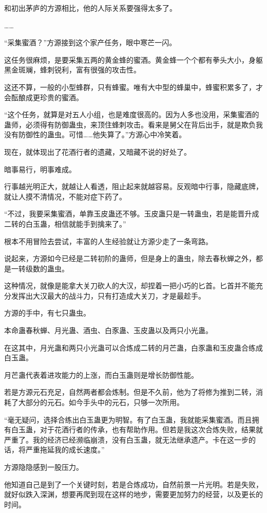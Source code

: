 \begin{this_body}
和初出茅庐的方源相比，他的人际关系要强得太多了。

……

“采集蜜酒？”方源接到这个家产任务，眼中寒芒一闪。

这任务很麻烦，是要采集五两的黄金蜂的蜜酒。黄金蜂一个个都有拳头大小，身躯黑金斑斓，蜂刺锐利，富有很强的攻击性。

这还不算，一般的小型蜂群，只有蜂蜜。唯有大中型的蜂巢中，蜂蜜积累多了，才会酝酿成更珍贵的蜜酒。

“这个任务，就算是对五人小组，也是难度很高的。因为人多也没用，采集蜜酒的蛊师，必须得有防御蛊虫，来顶住蜂刺攻击。看来是舅父在背后出手，就是欺负我没有防御性的蛊虫。可惜……他失算了。”方源心中冷笑着。

现在，就体现出了花酒行者的遗藏，又暗藏不说的好处了。

暗事易行，明事难成。

行事越光明正大，就越让人看透，阻止起来就越容易。反观暗中行事，隐藏底牌，就让人摸不清情况，不能对症下药了。

“不过，我要采集蜜酒，单靠玉皮蛊还不够。玉皮蛊只是一转蛊虫，若是能晋升成二转的白玉蛊，相信就能手到擒来了。”

根本不用冒险去尝试，丰富的人生经验就让方源少走了一条弯路。

说起来，方源如今已经是二转初阶的蛊师，但是身上的蛊虫，除去春秋蝉之外，都是一转级数的蛊虫。

这种情况，就像是能拿大关刀砍人的大汉，却捏着一把小巧的匕首。匕首并不能充分发挥出大汉最大的战斗力，只有打造成大关刀，才是最趁手。

方源的手中，有七只蛊虫。

本命蛊春秋蝉、月光蛊、酒虫、白豕蛊、玉皮蛊以及两只小光蛊。

在这其中，月光蛊和两只小光蛊可以合炼成二转的月芒蛊，白豕蛊和玉皮蛊合练成白玉蛊。

月芒蛊代表着进攻能力的上涨，而白玉蛊则是增长防御性能。

若是方源元石充足，自然两者都会炼制。但是不久前，他为了将修为推到二转，消耗了大部分的元石。如今手头中的元石，只够一次所用。

“毫无疑问，选择合练出白玉蛊更为明智。有了白玉蛊，我就能采集蜜酒。而且拥有白玉蛊，对于花酒行者的传承，也有帮助作用。但若是我这次合炼失败，结果就严重了。我的经济已经濒临崩溃，没有白玉蛊，就无法继承遗产。卡在这一步的话，将严重拖延我的成长速度。”

方源隐隐感到一股压力。

他知道自己是到了一个关键时刻，若是合炼成功，自然前景一片光明。若是失败，就好似跌入深渊，想要再爬到现在这样的地步，需要更加努力的经营，以及更长的时间。


\end{this_body}
